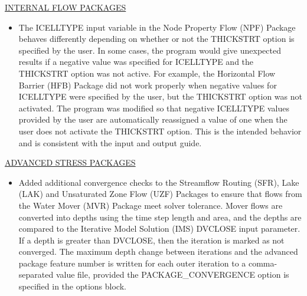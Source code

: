 	\underline{INTERNAL FLOW PACKAGES}
	\begin{itemize}
		\item The ICELLTYPE input variable in the Node Property Flow (NPF) Package behaves differently depending on whether or not the THICKSTRT option is specified by the user.  In some cases, the program would give unexpected results if a negative value was specified for ICELLTYPE and the THICKSTRT option was not active.  For example, the Horizontal Flow Barrier (HFB) Package did not work properly when negative values for ICELLTYPE were specified by the user, but the THICKSTRT option was not activated.  The program was modified so that negative ICELLTYPE values provided by the user are automatically reassigned a value of one when the user does not activate the THICKSTRT option.  This is the intended behavior and is consistent with the input and output guide.   
	\end{itemize}


	\underline{ADVANCED STRESS PACKAGES}
	\begin{itemize}
		\item Added additional convergence checks to the Streamflow Routing (SFR), Lake (LAK) and Unsaturated Zone Flow (UZF) Packages to ensure that flows from the Water Mover (MVR) Package meet solver tolerance.  Mover flows are converted into depths using the time step length and area, and the depths are compared to the Iterative Model Solution (IMS) DVCLOSE input parameter.  If a depth is greater than DVCLOSE, then the iteration is marked as not converged.  The maximum depth change between iterations and the advanced package feature number is written for each outer iteration to a comma-separated value file, provided the PACKAGE\_CONVERGENCE option is specified in the options block.
		
	\end{itemize}



